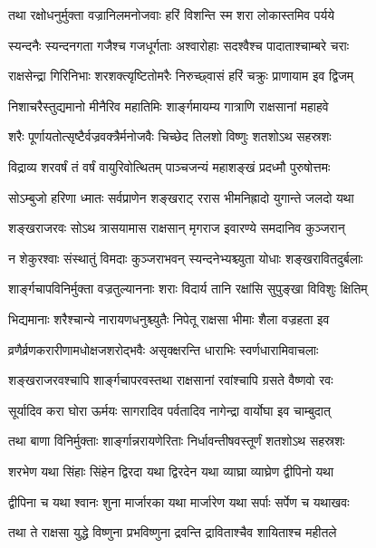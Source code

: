 \twolineshloka
{तथा रक्षोधनुर्मुक्ता वज्रानिलमनोजवाः}
{हरिं विशन्ति स्म शरा लोकास्तमिव पर्यये} %

\twolineshloka
{स्यन्दनैः स्यन्दनगता गजैश्च गजधूर्गताः}
{अश्वारोहाः सदश्वैश्च पादाताश्चाम्बरे चराः} %

\twolineshloka
{राक्षसेन्द्रा गिरिनिभाः शरशक्त्यृष्टितोमरैः}
{निरुच्छ्वासं हरिं चक्रुः प्राणायाम इव द्विजम्} %

\twolineshloka
{निशाचरैस्तुद्यमानो मीनैरिव महातिमिः}
{शार्ङ्गमायम्य गात्राणि राक्षसानां महाहवे} %

\twolineshloka
{शरैः पूर्णायतोत्सृष्टैर्वज्रवक्त्रैर्मनोजवैः}
{चिच्छेद तिलशो विष्णुः शतशोऽथ सहस्रशः} %

\twolineshloka
{विद्राव्य शरवर्षं तं वर्षं वायुरिवोत्थितम्}
{पाञ्चजन्यं महाशङ्खं प्रदध्मौ पुरुषोत्तमः} %

\twolineshloka
{सोऽम्बुजो हरिणा ध्मातः सर्वप्राणेन शङ्खराट्}
{ररास भीमनिह्रादो युगान्ते जलदो यथा} %

\twolineshloka
{शङ्खराजरवः सोऽथ त्रासयामास राक्षसान्}
{मृगराज इवारण्ये समदानिव कुञ्जरान्} %

\twolineshloka
{न शेकुरश्वाः संस्थातुं विमदाः कुञ्जराभवन्}
{स्यन्दनेभ्यश्च्युता योधाः शङ्खरावितदुर्बलाः} %

\twolineshloka
{शार्ङ्गचापविनिर्मुक्ता वज्रतुल्याननाः शराः}
{विदार्य तानि रक्षांसि सुपुङ्खा विविशुः क्षितिम्} %

\twolineshloka
{भिद्यमानाः शरैश्चान्ये नारायणधनुश्च्युतैः}
{निपेतू राक्षसा भीमाः शैला वज्रहता इव} %

\twolineshloka
{व्रणैर्व्रणकरारीणामधोक्षजशरोद्भवैः}
{असृक्क्षरन्ति धाराभिः स्वर्णधारामिवाचलाः} %

\twolineshloka
{शङ्खराजरवश्चापि शार्ङ्गचापरवस्तथा}
{राक्षसानां रवांश्चापि ग्रसते वैष्णवो रवः} %

\twolineshloka
{सूर्यादिव करा घोरा ऊर्मयः सागरादिव}
{पर्वतादिव नागेन्द्रा वार्योघा इव चाम्बुदात्} %

\twolineshloka
{तथा बाणा विनिर्मुक्ताः शार्ङ्गान्नरायणेरिताः}
{निर्धावन्तीषवस्तूर्णं शतशोऽथ सहस्रशः} %

\twolineshloka
{शरभेण यथा सिंहाः सिंहेन द्विरदा यथा}
{द्विरदेन यथा व्याघ्रा व्याघ्रेण द्वीपिनो यथा} %

\twolineshloka
{द्वीपिना च यथा श्वानः शुना मार्जारका यथा}
{मार्जारेण यथा सर्पाः सर्पेण च यथाखवः} %

\twolineshloka
{तथा ते राक्षसा युद्धे विष्णुना प्रभविष्णुना}
{द्रवन्ति द्राविताश्चैव शायिताश्च महीतले} %

